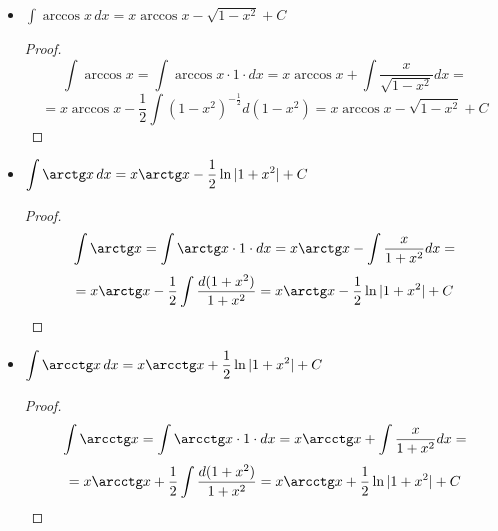 \begin{itemize}
	\item $\displaystyle \int \arccos x\,dx = x \arccos x - \sqrt{1 - x^2} + C$
	\begin{proof}
	\begin{equation*}
	\int \arccos x =
	\int \arccos x \cdot 1 \cdot dx =
	x \arccos x + \int \frac{x}{\sqrt{1 - x^2}} dx =
	\end{equation*}
	\begin{equation*}
	= x \arccos x - \frac12 \int (1 - x^2)^{-\tfrac12} d(1 - x^2) =
	x \arccos x - \sqrt{1 - x^2} + C
	\end{equation*}
	\end{proof}
	
	\item $\displaystyle \int \arctg x\,dx = x \arctg x - \frac12 \ln |1 + x^2| + C$
	\begin{proof}
	\begin{equation*}
	\int \arctg x =
	\int \arctg x \cdot 1 \cdot dx =
	x \arctg x - \int \frac{x}{1 + x^2} dx =
	\end{equation*}
	\begin{equation*}
	= x \arctg x - \frac12 \int \frac{d(1 + x^2)}{1 + x^2} =
	x \arctg x - \frac12 \ln |1 + x^2| + C
	\end{equation*}
	\end{proof}
	
	\item $\displaystyle \int \arcctg x\,dx = x \arcctg x + \frac12 \ln |1 + x^2| + C$
	\begin{proof}
	\begin{equation*}
	\int \arcctg x =
	\int \arcctg x \cdot 1 \cdot dx =
	x \arcctg x + \int \frac{x}{1 + x^2} dx =
	\end{equation*}
	\begin{equation*}
	= x \arcctg x + \frac12 \int \frac{d(1 + x^2)}{1 + x^2} =
	x \arcctg x + \frac12 \ln |1 + x^2| + C
	\end{equation*}
	\end{proof}
\end{itemize}